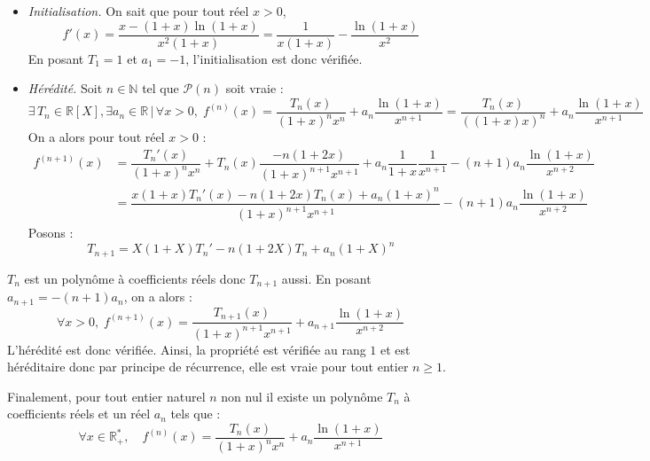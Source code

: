 \documentclass[a4paper,twoside,french,10pt]{VcCours}
\begin{document}
\begin{enumerate}
\begin{itemize}
\item \textit{Initialisation.} On sait que pour tout réel $x>0$,
$$ f'(x) = \dfrac{x-\left(  1+x\right)  \ln\left(
1+x\right)  }{x^{2}\left(  1+x\right)  } = \dfrac{1}{x\left(  1+x\right)  } - \dfrac{ \ln\left(
1+x\right)  }{x^{2}}$$
En posant $T_1=1$ et $a_1=-1$, l'initialisation est donc vérifiée.
\item \textit{Hérédité.} Soit $n \in \mathbb{N}$ tel que $\mathcal{P}(n)$ soit vraie : 
$$ \exists \, T_n \in \mathbb{R}[X], \exists a_n \in \mathbb{R} \, \vert \, \forall x>0, \; f^{\left(  n\right)  }\left(
x\right)  =\dfrac{T_{n}\left(  x\right)  }{\left(  1+x\right)  ^{n}x^{n}%
}+a_{n}\dfrac{\ln\left(  1+x\right)  }{x^{n+1}} = \dfrac{T_{n}\left(  x\right)  }{(\left(  1+x\right) x) ^{n}%
}+a_{n}\dfrac{\ln\left(  1+x\right)  }{x^{n+1}}$$
On a alors pour tout réel $x>0$ :
\begin{align*}
f^{\left(  n+1\right)  }\left(  x\right)   & =\dfrac{T_{n}'\left(
x\right)  }{\left(  1+x\right)  ^{n}x^{n}}+T_{n}(x)\dfrac{-n(1+2x)}{\left(  1+x\right)
^{n+1}x^{n+1}}+a_{n}\dfrac{1}{1+x}\dfrac{1}{x^{n+1}}-\left(  n+1\right)
a_{n}\dfrac{\ln\left(  1+x\right)  }{x^{n+2}}\\
& =\dfrac{x\left(  1+x\right)  T_{n}'\left(  x\right)  -n\left(
1+2x\right)  T_{n}(x)+a_{n}\left(  1+x\right)  ^{n}}{\left(  1+x\right)
^{n+1}x^{n+1}}-\left(  n+1\right)  a_{n}\dfrac{\ln\left(  1+x\right)
}{x^{n+2}}%
\end{align*}
Posons :
$$ T_{n+1} =X\left(  1+X\right)  T_{n}'  -n\left(  1+2X\right)  T_{n}+a_{n}\left(  1+X\right)  ^{n}$$
\end{itemize}
$T_n$ est un polynôme à coefficients réels donc $T_{n+1}$ aussi. En posant $a_{n+1}= -(n+1)a_n$, on a alors :
$$ \forall x>0, \; f^{\left(  n+1\right)  }\left(
x\right)  =\dfrac{T_{n+1}\left(  x\right)  }{\left(  1+x\right)  ^{n+1}x^{n+1}%
}+a_{n+1}\dfrac{\ln\left(  1+x\right)  }{x^{n+2}}$$
L'hérédité est donc vérifiée. Ainsi, la propriété est vérifiée au rang $1$ et est héréditaire donc par principe de récurrence, elle est vraie pour tout entier $n \geq 1$.

\medskip

\noindent Finalement, pour tout entier naturel $n$ non nul il existe un polynôme
$T_{n}$ \`a coefficients réels et un réel $a_{n}$ tels que :%
\[
\boxed{\forall x\in\mathbb{R}_{+}^{*},\quad f^{\left(  n\right)  }\left(
x\right)  =\dfrac{T_{n}\left(  x\right)  }{\left(  1+x\right)  ^{n}x^{n}%
}+a_{n}\dfrac{\ln\left(  1+x\right)  }{x^{n+1}}}
\]



\end{enumerate}
\end{document}
